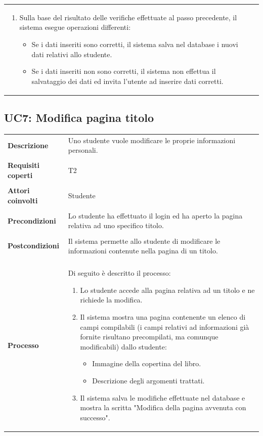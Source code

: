 \documentclass[10pt,a4paper]{report}
\begin{document}
\begin{tabular}{lp{}}
\begin{enumerate}
			\item Sulla base del risultato delle verifiche effettuate al passo precedente, il sistema esegue operazioni differenti:
			\begin{itemize}
				\item Se i dati inseriti sono corretti, il sistema salva nel database i nuovi dati relativi allo studente.
				\item Se i dati inseriti non sono corretti, il sistema non effettua il salvataggio dei dati ed invita l'utente ad inserire dati corretti.
			\end{itemize}
		\end{enumerate}
	\end{tabular}

	\subsection{UC7: Modifica pagina titolo}
	\begin{tabular}{lp{}}
		\textbf{Descrizione}&Uno studente vuole modificare le proprie informazioni personali.\\
		\\
		\textbf{Requisiti coperti}&T2\\
		\\
		\textbf{Attori coinvolti}&Studente\\
		\\
		\textbf{Precondizioni}&Lo studente ha effettuato il login ed ha aperto la pagina relativa ad uno specifico titolo.\\
		\\
		\textbf{Postcondizioni}&Il sistema permette allo studente di modificare le informazioni contenute nella pagina di un titolo.\\
		\\
		\textbf{Processo}&Di seguito è descritto il processo:
		\begin{enumerate}
			\item Lo studente accede alla pagina relativa ad un titolo e ne richiede la modifica.
			\item Il sistema mostra una pagina contenente un elenco di campi compilabili (i campi relativi ad informazioni già fornite risultano precompilati, ma comunque modificabili) dallo studente:
			\begin{itemize}
				\item Immagine della copertina del libro.
				\item Descrizione degli argomenti trattati.
			\end{itemize}
			\item Il sistema salva le modifiche effettuate nel database e mostra la scritta "Modifica della pagina avvenuta con successo".
		\end{enumerate}
	\end{tabular}
\end{document}
